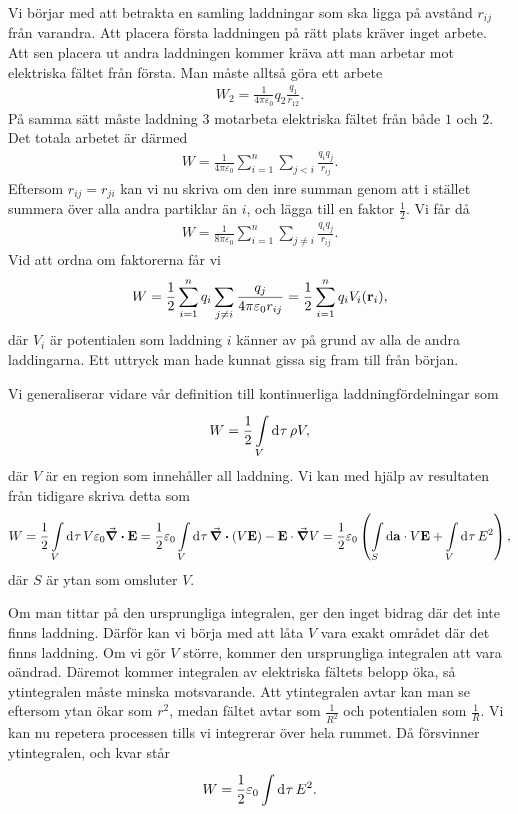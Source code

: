 Vi börjar med att betrakta en samling laddningar som ska ligga på avstånd $r_{ij}$ från varandra. Att placera första laddningen på rätt plats kräver inget arbete. Att sen placera ut andra laddningen kommer kräva att man arbetar mot elektriska fältet från första. Man måste alltså göra ett arbete
\begin{align*}
	W_{2} = \frac{1}{4\pi\varepsilon_{0}}q_{2}\frac{q_{1}}{r_{12}}.
\end{align*}
På samma sätt måste laddning $3$ motarbeta elektriska fältet från både $1$ och $2$. Det totala arbetet är därmed
\begin{align*}
	W = \frac{1}{4\pi\varepsilon_{0}}\sum\limits_{i = 1}^{n}\sum\limits_{j < i}\frac{q_{i}q_{j}}{r_{ij}}.
\end{align*}
Eftersom $r_{ij} = r_{ji}$ kan vi nu skriva om den inre summan genom att i stället summera över alla andra partiklar än $i$, och lägga till en faktor $\frac{1}{2}$. Vi får då
\begin{align*}
	W = \frac{1}{8\pi\varepsilon_{0}}\sum\limits_{i = 1}^{n}\sum\limits_{j \neq i}\frac{q_{i}q_{j}}{r_{ij}}.
\end{align*}
Vid att ordna om faktorerna får vi
\begin{align*}
	W = \frac{1}{2}\sum\limits_{i = 1}^{n}q_{i}\sum\limits_{j \neq i}\frac{q_{j}}{4\pi\varepsilon_{0}r_{ij}} = \frac{1}{2}\sum\limits_{i = 1}^{n}q_{i}V_{i}(\vb{r}_{i}),
\end{align*}
där $V_{i}$ är potentialen som laddning $i$ känner av på grund av alla de andra laddingarna. Ett uttryck man hade kunnat gissa sig fram till från början.

Vi generaliserar vidare vår definition till kontinuerliga laddningfördelningar som
\begin{align*}
	W = \frac{1}{2}\int\limits_{V}^{}\dd[]{\tau}\rho V,
\end{align*}
där $V$ är en region som innehåller all laddning. Vi kan med hjälp av resultaten från tidigare skriva detta som
\begin{align*}
	W = \frac{1}{2}\int\limits_{V}^{}\dd[]{\tau}V\varepsilon_{0}\div{\vb{E}} = \frac{1}{2}\varepsilon_{0}\int\limits_{V}^{}\dd[]{\tau}\div(V\vb{E}) - \vb{E}\cdot\grad{V} = \frac{1}{2}\varepsilon_{0}\left(\int\limits_{S}^{}\dd{\vb{a}}\cdot V\vb{E} + \int\limits_{V}^{}\dd[]{\tau}E^{2}\right),
\end{align*}
där $S$ är ytan som omsluter $V$.

Om man tittar på den ursprungliga integralen, ger den inget bidrag där det inte finns laddning. Därför kan vi börja med att låta $V$ vara exakt området där det finns laddning. Om vi gör $V$ större, kommer den ursprungliga integralen att vara oändrad. Däremot kommer integralen av elektriska fältets belopp öka, så ytintegralen måste minska motsvarande. Att ytintegralen avtar kan man se eftersom ytan ökar som $r^{2}$, medan fältet avtar som $\frac{1}{R^{2}}$ och potentialen som $\frac{1}{R}$. Vi kan nu repetera processen tills vi integrerar över hela rummet. Då försvinner ytintegralen, och kvar står
\begin{align*}
	W = \frac{1}{2}\varepsilon_{0}\int\limits_{}^{}\dd[]{\tau}E^{2}.
\end{align*}

